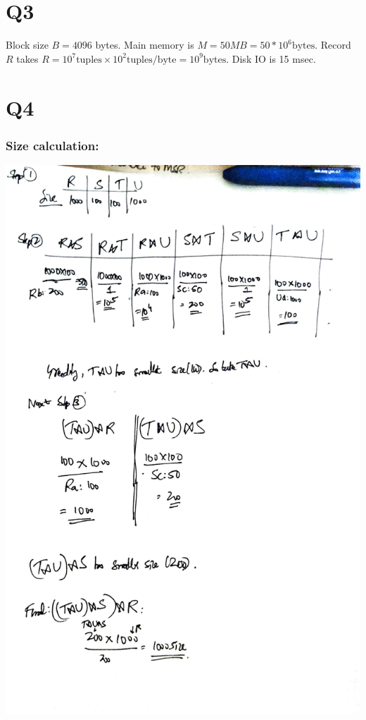 \documentclass{article}
\begin{document}
\section{Q3}
Block size $B = 4096$ bytes. Main memory is $M = 50 MB = 50 * 10^6 \text{bytes}$. Record $R$
takes $R = 10^7\text{tuples} \times 10^2 \text{tuples/byte} = 10^9 \text{bytes}$.
Disk IO is 15 msec.

\section{Q4}
\subsubsection{Size calculation:}
\includegraphics[width=\textwidth]{db-q4-1.pdf}
\end{document}

